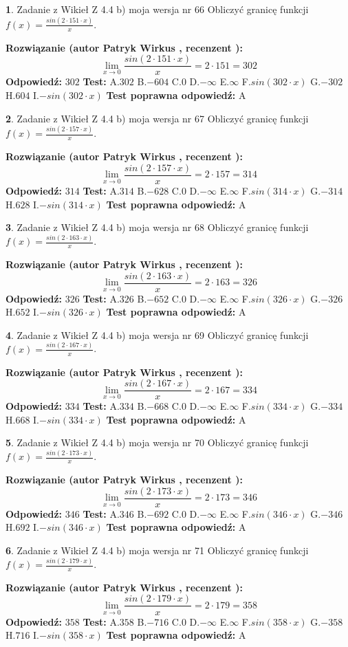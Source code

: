 \documentclass[12pt, a4paper]{article}
\theoremstyle{definition} %
\newtheorem{zad}{}
\newcommand{\zadStart}[1]{\begin{zad}#1\newline}
\newcommand{\zadStop}{\end{zad}}
\newcommand{\rozwStart}[2]{\noindent \textbf{Rozwiązanie (autor #1 , recenzent #2): }\newline}
\newcommand{\rozwStop}{\newline}
\newcommand{\odpStart}{\noindent \textbf{Odpowiedź:}\newline}
\newcommand{\odpStop}{\newline}
\newcommand{\testStart}{\noindent \textbf{Test:}\newline}
\newcommand{\testStop}{\newline}
\newcommand{\kluczStart}{\noindent \textbf{Test poprawna odpowiedź:}\newline}
\newcommand{\kluczStop}{\newline}
\begin{document}
\zadStart{Zadanie z Wikieł Z 4.4 b) moja wersja nr 66}
Obliczyć granicę funkcji $f(x)=\frac{sin(2 \cdot151\cdot x)}{x}$.
\zadStop
\rozwStart{Patryk Wirkus}{}
$$\lim\limits_{x\to 0}\frac{sin(2 \cdot 151\cdot x)}{x}=
2 \cdot 151 = 302$$
\rozwStop
\odpStart
$302$
\odpStop
\testStart
A.$302$
B.$-604$
C.$0$
D.$-\infty$
E.$\infty$
F.$sin(302\cdot x)$
G.$-302$
H.$604$
I.$-sin(302\cdot x)$
\testStop
\kluczStart
A
\kluczStop



\zadStart{Zadanie z Wikieł Z 4.4 b) moja wersja nr 67}
Obliczyć granicę funkcji $f(x)=\frac{sin(2 \cdot157\cdot x)}{x}$.
\zadStop
\rozwStart{Patryk Wirkus}{}
$$\lim\limits_{x\to 0}\frac{sin(2 \cdot 157\cdot x)}{x}=
2 \cdot 157 = 314$$
\rozwStop
\odpStart
$314$
\odpStop
\testStart
A.$314$
B.$-628$
C.$0$
D.$-\infty$
E.$\infty$
F.$sin(314\cdot x)$
G.$-314$
H.$628$
I.$-sin(314\cdot x)$
\testStop
\kluczStart
A
\kluczStop



\zadStart{Zadanie z Wikieł Z 4.4 b) moja wersja nr 68}
Obliczyć granicę funkcji $f(x)=\frac{sin(2 \cdot163\cdot x)}{x}$.
\zadStop
\rozwStart{Patryk Wirkus}{}
$$\lim\limits_{x\to 0}\frac{sin(2 \cdot 163\cdot x)}{x}=
2 \cdot 163 = 326$$
\rozwStop
\odpStart
$326$
\odpStop
\testStart
A.$326$
B.$-652$
C.$0$
D.$-\infty$
E.$\infty$
F.$sin(326\cdot x)$
G.$-326$
H.$652$
I.$-sin(326\cdot x)$
\testStop
\kluczStart
A
\kluczStop



\zadStart{Zadanie z Wikieł Z 4.4 b) moja wersja nr 69}
Obliczyć granicę funkcji $f(x)=\frac{sin(2 \cdot167\cdot x)}{x}$.
\zadStop
\rozwStart{Patryk Wirkus}{}
$$\lim\limits_{x\to 0}\frac{sin(2 \cdot 167\cdot x)}{x}=
2 \cdot 167 = 334$$
\rozwStop
\odpStart
$334$
\odpStop
\testStart
A.$334$
B.$-668$
C.$0$
D.$-\infty$
E.$\infty$
F.$sin(334\cdot x)$
G.$-334$
H.$668$
I.$-sin(334\cdot x)$
\testStop
\kluczStart
A
\kluczStop



\zadStart{Zadanie z Wikieł Z 4.4 b) moja wersja nr 70}
Obliczyć granicę funkcji $f(x)=\frac{sin(2 \cdot173\cdot x)}{x}$.
\zadStop
\rozwStart{Patryk Wirkus}{}
$$\lim\limits_{x\to 0}\frac{sin(2 \cdot 173\cdot x)}{x}=
2 \cdot 173 = 346$$
\rozwStop
\odpStart
$346$
\odpStop
\testStart
A.$346$
B.$-692$
C.$0$
D.$-\infty$
E.$\infty$
F.$sin(346\cdot x)$
G.$-346$
H.$692$
I.$-sin(346\cdot x)$
\testStop
\kluczStart
A
\kluczStop



\zadStart{Zadanie z Wikieł Z 4.4 b) moja wersja nr 71}
Obliczyć granicę funkcji $f(x)=\frac{sin(2 \cdot179\cdot x)}{x}$.
\zadStop
\rozwStart{Patryk Wirkus}{}
$$\lim\limits_{x\to 0}\frac{sin(2 \cdot 179\cdot x)}{x}=
2 \cdot 179 = 358$$
\rozwStop
\odpStart
$358$
\odpStop
\testStart
A.$358$
B.$-716$
C.$0$
D.$-\infty$
E.$\infty$
F.$sin(358\cdot x)$
G.$-358$
H.$716$
I.$-sin(358\cdot x)$
\testStop
\kluczStart
A
\kluczStop
\end{document}

